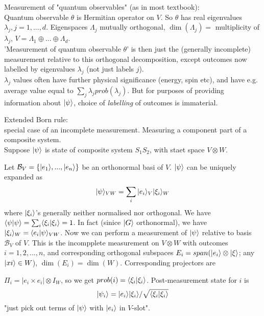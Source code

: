 \documentclass[a4paper]{article}
\begin{document}
Measurement of "quantum observables" (as in most textbook):\\
Quantum observable $\theta$ is Hermitian operator on $V$. So $\theta$ has real eigenvalues $\lambda_j, j=1,...,d$. Eigenspaces $\Lambda_j$ mutually orthogonal, $\dim(\Lambda_j) = $ multiplicity of $\lambda_j$, $V= \Lambda_1 \oplus ... \oplus \Lambda_d$.\\
'Measurement of quantum observable $\theta$' is then just the (generally incomplete) measurement relative to this orthogonal decomposition, except outcomes now labelled by eigenvalues $\lambda_j$ (not just labels $j$).\\
$\lambda_j$ values often have further physical significance (energy, spin etc), and have e.g. average value equal to $\sum_j \lambda_j prob(\lambda_j)$. But for purposes of providing information about $|\psi\rangle$, choice of \emph{labelling} of outcomes is immaterial.

Extended Born rule:\\
special case of an incomplete measurement. Measuring a component part of a composite system.\\
Suppose $|\psi\rangle$ is state of composite system $S_1S_2$, with staet space $V \otimes W$.

Let $\mathcal{B}_V = \{|e_1 \rangle, ..., |e_n\rangle\}$ be an orthonormal basi of $V$. $|\psi\rangle$ can be uniquely expanded as $$|\psi\rangle_{VW} = \sum_i |e_i \rangle_V |\xi_i\rangle_W$$ 
where $|\xi_i\rangle$'s generally neither normalised nor orthogonal. We have $\langle \psi|\psi \rangle = \sum_i \langle \xi_i | \xi_i \rangle = 1$. In fact (sinice $|G\rangle$ orthonormal), we have $|\xi_i\rangle_W =\langle e_i | \psi\rangle_{VW}$. Now we can perform a measurement of $|\psi\rangle $ relative to basis $\mathcal{B}_V$ of $V$. This is the incompplete measurement on $V \otimes W$ with outcomes $i=1,2,...,n$, and corresponding orthogonal subspaces $E_i = span(|e_i \rangle \otimes |\xi \rangle$; any $|xi\rangle \in W$), $\dim (E_i) = \dim(W)$. Corresponding projectors are

$\Pi_i = |e_i \times e_i| \otimes I_W$, so we get $prob(i) = \langle \xi_i | \xi_i\rangle$. Post-measurement state for $i$ is $$|\psi_i \rangle = |e_i \rangle |\xi_i\rangle / \sqrt{\langle \xi_i | \xi_i \rangle}$$ 
"just pick out terms of $|\psi\rangle$ with $|e_i\rangle$ in $V$-slot".

\iffalse
\begin{equation*}
\begin{aligned}

\end{aligned}
\end{equation*}
\fi
\end{document}

